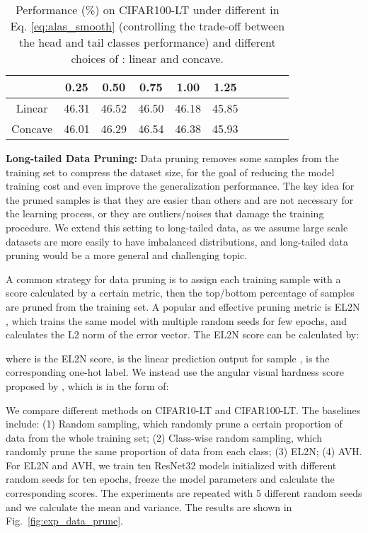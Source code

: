 \documentclass[10pt,twocolumn,letterpaper]{article}
\begin{document}
\begin{table}[tb!]
\centering
\caption{Performance (\%) on CIFAR100-LT under different  in Eq. \ref{eq:alas_smooth} (controlling the trade-off between the head and tail classes performance) and different choices of : linear and concave.}\vspace{-5pt}
\begin{tabular}{c|ccccccccc}
\hline
 & 0.25 & 0.50 & 0.75 & 1.00 & 1.25 \\ \hline \hline
Linear  & 46.31 & 46.52 & 46.50 & 46.18 & 45.85  \\ \hline 
Concave  & 46.01 & 46.29 & 46.54 & 46.38 & 45.93  \\ \hline
\end{tabular}
\label{tab:ablation_tau}
\end{table}
\textbf{Long-tailed Data Pruning:} Data pruning removes some samples from the training set to compress the dataset size, for the goal of reducing the model training cost and even improve the generalization performance. The key idea for the pruned samples is that they are easier than others and are not necessary for the learning process, or they are outliers/noises that damage the training procedure. We extend this setting to long-tailed data, as we assume large scale datasets are more easily to have imbalanced distributions, and long-tailed data pruning would be a more general and challenging topic.   

A common strategy for data pruning is to assign each training sample with a score calculated by a certain metric, then the top/bottom percentage of samples are pruned from the training set. A popular and effective pruning metric is EL2N \cite{el2n}, which trains the same model with multiple random seeds for few epochs, and calculates the L2 norm of the error vector. The EL2N score can be calculated by:

where  is the EL2N score,  is the linear prediction output for sample ,  is the corresponding one-hot label. We instead use the angular visual hardness score  proposed by \cite{avh}, which is in the form of:


We compare different methods on CIFAR10-LT and CIFAR100-LT. The baselines include: (1) Random sampling, which randomly prune a certain proportion of data from the whole training set; (2) Class-wise random sampling, which randomly prune the same proportion of data from each class; (3) EL2N; (4) AVH. For EL2N and AVH, we train ten ResNet32 models initialized with different random seeds for ten epochs, freeze the model parameters and calculate the corresponding scores. The experiments are repeated with 5 different random seeds and we calculate the mean and variance. The results are shown in Fig.~\ref{fig:exp_data_prune}.
\end{document}
